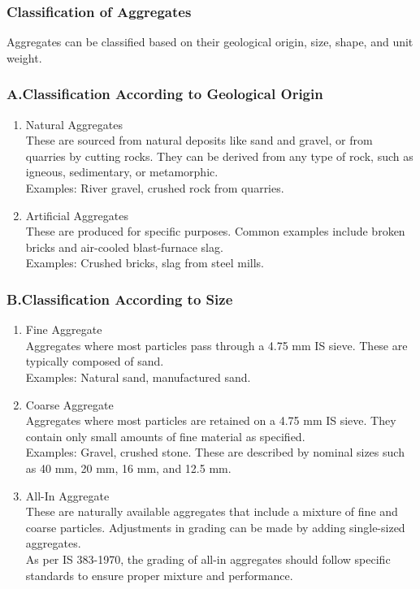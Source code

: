 \documentclass[a4paper,11pt]{book}
\begin{document}
\subsubsection{Classification of Aggregates}

Aggregates can be classified based on their geological origin, size, shape, and unit weight.

\subsubsection{A.Classification According to Geological Origin}

\begin{enumerate}
    \item Natural Aggregates
\\These are sourced from natural deposits like sand and gravel, or from quarries by cutting rocks. They can be derived from any type of rock, such as igneous, sedimentary, or metamorphic.
\\Examples: River gravel, crushed rock from quarries.
  
\item Artificial Aggregates
\\These are produced for specific purposes. Common examples include broken bricks and air-cooled blast-furnace slag.
\\Examples: Crushed bricks, slag from steel mills.
\end{enumerate}
\subsubsection{B.Classification According to Size}

\begin{enumerate}
    \item Fine Aggregate
    \\Aggregates where most particles pass through a 4.75 mm IS sieve. These are typically composed of sand.
\\Examples: Natural sand, manufactured sand.
  
\item Coarse Aggregate
\\Aggregates where most particles are retained on a 4.75 mm IS sieve. They contain only small amounts of fine material as specified.
\\Examples: Gravel, crushed stone. These are described by nominal sizes such as 40 mm, 20 mm, 16 mm, and 12.5 mm.
  
\item All-In Aggregate
\\These are naturally available aggregates that include a mixture of fine and coarse particles. Adjustments in grading can be made by adding single-sized aggregates.
\\As per IS 383-1970, the grading of all-in aggregates should follow specific standards to ensure proper mixture and performance.
\end{enumerate}
\end{document}
